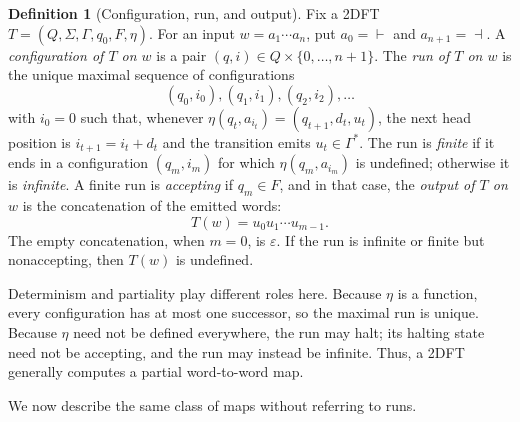 \documentclass[11pt]{article}
\theoremstyle{definition}
\newtheorem{definition}[theorem]{Definition}
\begin{document}
\begin{definition}[Configuration, run, and output]
Fix a 2DFT $T=(Q,\Sigma,\Gamma,q_0,F,\eta)$.  For an input
$w=a_1\cdots a_n$, put $a_0=\vdash$ and $a_{n+1}=\dashv$.  A
\emph{configuration of $T$ on $w$} is a pair
$(q,i)\in Q\times\{0,\ldots,n+1\}$.  The \emph{run of $T$ on $w$} is the unique
maximal sequence of configurations
\[
   (q_0,i_0),(q_1,i_1),(q_2,i_2),\ldots
\]
with $i_0=0$ such that, whenever $\eta(q_t,a_{i_t})=(q_{t+1},d_t,u_t)$,
the next head position is $i_{t+1}=i_t+d_t$ and the transition emits
$u_t\in\Gamma^*$.  The run is \emph{finite} if it ends in a configuration
$(q_m,i_m)$ for which $\eta(q_m,a_{i_m})$ is undefined; otherwise it is
\emph{infinite}.  A finite run is \emph{accepting} if $q_m\in F$, and in that case,
the \emph{output of $T$ on $w$} is the concatenation of the emitted words:
\[
   T(w)=u_0u_1\cdots u_{m-1}.
\]
The empty concatenation, when $m=0$, is $\varepsilon$.
If the run is infinite or finite but nonaccepting, then $T(w)$ is undefined.
\end{definition}

Determinism and partiality play different roles here.  Because $\eta$ is a
function, every configuration has at most one successor, so the maximal run is
unique.  Because $\eta$ need not be defined everywhere, the run may halt; its
halting state need not be accepting, and the run may instead be infinite.
Thus, a 2DFT generally computes a partial word-to-word map.

We now describe the same class of maps without referring to runs.
\end{document}
